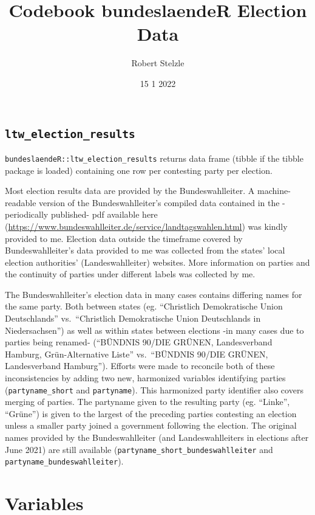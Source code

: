 \documentclass[
]{article}
\title{Codebook bundeslaendeR Election Data}
\author{Robert Stelzle}
\date{15 1 2022}
\begin{document}
\maketitle

\hypertarget{ltw_election_results}{%
\subsection{\texorpdfstring{\texttt{ltw\_election\_results}}{ltw\_election\_results}}\label{ltw_election_results}}

\texttt{bundeslaendeR::ltw\_election\_results} returns data frame
(tibble if the tibble package is loaded) containing one row per
contesting party per election.

Most election results data are provided by the Bundeswahlleiter. A
machine-readable version of the Bundeswahlleiter's compiled data
contained in the -periodically published- pdf available here
(\url{https://www.bundeswahlleiter.de/service/landtagswahlen.html}) was
kindly provided to me. Election data outside the timeframe covered by
Bundeswahlleiter's data provided to me was collected from the states'
local election authorities' (Landeswahlleiter) websites. More
information on parties and the continuity of parties under different
labels was collected by me.

The Bundeswahlleiter's election data in many cases contains differing
names for the same party. Both between states (eg. ``Christlich
Demokratische Union Deutschlands'' vs.~``Christlich Demokratische Union
Deutschlands in Niedersachsen'') as well as within states between
elections -in many cases due to parties being renamed- (``BÜNDNIS 90/DIE
GRÜNEN, Landesverband Hamburg, Grün-Alternative Liste'' vs.~``BÜNDNIS
90/DIE GRÜNEN, Landesverband Hamburg''). Efforts were made to reconcile
both of these inconsistencies by adding two new, harmonized variables
identifying parties (\texttt{partyname\_short} and \texttt{partyname}).
This harmonized party identifier also covers merging of parties. The
partyname given to the resulting party (eg. ``Linke'', ``Grüne'') is
given to the largest of the preceding parties contesting an election
unless a smaller party joined a government following the election. The
original names provided by the Bundeswahlleiter (and Landeswahlleiters
in elections after June 2021) are still available
(\texttt{partyname\_short\_bundeswahlleiter} and
\texttt{partyname\_bundeswahlleiter}).

\newpage

\hypertarget{variables}{%
\section{Variables}\label{variables}}
\end{document}
